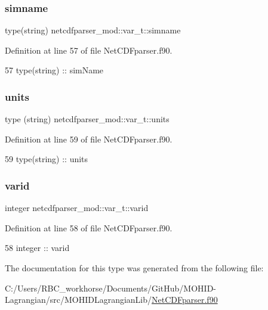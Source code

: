 \subsubsection{\texorpdfstring{simname}{simname}}
{\footnotesize\ttfamily type(string) netcdfparser\+\_\+mod\+::var\+\_\+t\+::simname\hspace{0.3cm}{\ttfamily [private]}}



Definition at line 57 of file Net\+C\+D\+Fparser.\+f90.


\begin{DoxyCode}
57         \textcolor{keywordtype}{type}(string) :: simName
\end{DoxyCode}
\mbox{\label{structnetcdfparser__mod_1_1var__t_ac7b0d52ef17496213c66b5a34dc8f8b6}} 
\subsubsection{\texorpdfstring{units}{units}}
{\footnotesize\ttfamily type (string) netcdfparser\+\_\+mod\+::var\+\_\+t\+::units\hspace{0.3cm}{\ttfamily [private]}}



Definition at line 59 of file Net\+C\+D\+Fparser.\+f90.


\begin{DoxyCode}
59         type(string) :: units
\end{DoxyCode}
\mbox{\label{structnetcdfparser__mod_1_1var__t_af3b333b148f6159bade3f9263c03892e}} 
\subsubsection{\texorpdfstring{varid}{varid}}
{\footnotesize\ttfamily integer netcdfparser\+\_\+mod\+::var\+\_\+t\+::varid\hspace{0.3cm}{\ttfamily [private]}}



Definition at line 58 of file Net\+C\+D\+Fparser.\+f90.


\begin{DoxyCode}
58         \textcolor{keywordtype}{integer} :: varid
\end{DoxyCode}


The documentation for this type was generated from the following file\+:\begin{DoxyCompactItemize}
\item 
C\+:/\+Users/\+R\+B\+C\+\_\+workhorse/\+Documents/\+Git\+Hub/\+M\+O\+H\+I\+D-\/\+Lagrangian/src/\+M\+O\+H\+I\+D\+Lagrangian\+Lib/\mbox{\hyperlink{_net_c_d_fparser_8f90}{Net\+C\+D\+Fparser.\+f90}}\end{DoxyCompactItemize}
